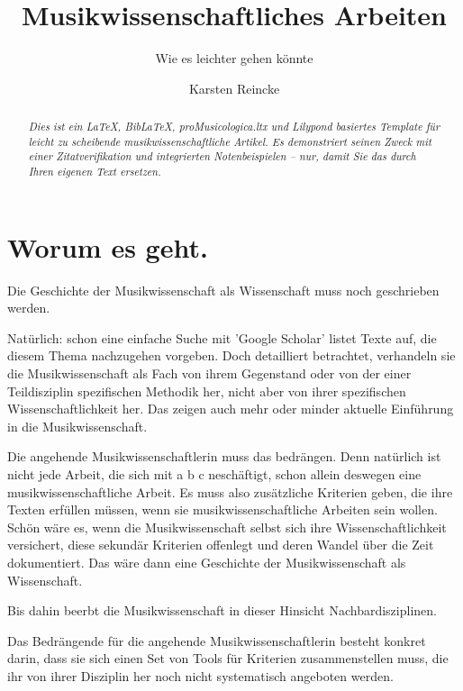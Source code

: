 \documentclass[
  DIV=calc,
  BCOR=5mm,
  11pt,
  headings=small,
  oneside,
  abstract=true,
  toc=bib,
  english,ngerman]{scrartcl}
\begin{document}
\nocite{*}

\titlehead{Klassifikation}
\subject{Release }
\title{Musikwissenschaftliches Arbeiten}
\subtitle{Wie es leichter gehen könnte}
\author{Karsten Reincke}

\maketitle

\begin{abstract}
\noindent \itshape
Dies ist ein \LaTeX, Bib\LaTeX, \emph{proMusicologica.ltx} und \emph{Lilypond} basiertes Template für leicht zu scheibende musikwissenschaftliche Artikel. Es demonstriert seinen Zweck mit einer Zitatverifikation und integrierten Notenbeispielen -- nur, damit Sie das durch Ihren eigenen Text ersetzen.
\end{abstract}

\footnotesize
\tableofcontents
\normalsize

\section{Worum es geht.}
Die Geschichte der Musikwissenschaft als Wissenschaft muss noch geschrieben werden.

Natürlich: schon eine einfache Suche mit 'Google Scholar' listet Texte auf, die diesem Thema nachzugehen vorgeben. Doch detailliert betrachtet, verhandeln sie die Musikwissenschaft als Fach von ihrem Gegenstand oder von der einer Teildisziplin spezifischen Methodik her, nicht aber von ihrer spezifischen Wissenschaftlichkeit her. Das zeigen auch mehr oder minder aktuelle Einführung in die Musikwissenschaft.

Die angehende Musikwissenschaftlerin muss das bedrängen. Denn natürlich ist nicht jede Arbeit, die sich mit a b c neschäftigt, schon allein deswegen eine musikwissenschaftliche Arbeit. Es muss also zusätzliche Kriterien geben, die ihre Texten erfüllen müssen, wenn sie musikwissenschaftliche Arbeiten sein wollen. Schön wäre es, wenn die Musikwissenschaft selbst sich ihre Wissenschaftlichkeit versichert, diese sekundär Kriterien offenlegt und deren Wandel über die Zeit dokumentiert. Das wäre dann eine Geschichte der Musikwissenschaft als Wissenschaft.

Bis dahin beerbt die Musikwissenschaft in dieser Hinsicht Nachbardisziplinen.

Das Bedrängende für die  angehende Musikwissenschaftlerin besteht konkret darin, dass sie sich einen Set von Tools für Kriterien zusammenstellen muss, die ihr von ihrer Disziplin her noch nicht systematisch angeboten werden.
\end{document}
